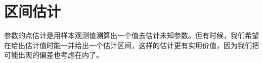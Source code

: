 \section{区间估计}
参数的点估计是用样本观测值测算出一个值去估计未知参数。但有时候，我们希望在给出估计值时能一并给出一个估计区间，这样的估计更有实用价值，因为我们把可能出现的偏差也考虑在内了。